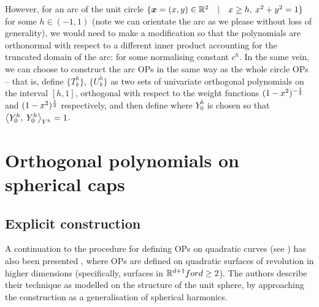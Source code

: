 However, for an arc of the unit circle $\{ \bm{x} = (x,y) \in \mathbb{R}^2 \quad | \quad x \ge h, \: x^2 + y^2 = 1 \}$ for some $h \in (-1, 1)$ (note we can orientate the arc as we please without loss of generality), we would need to make a modification so that the polynomials are orthonormal with respect to a different inner product accounting for the truncated domain of the arc:
for some normalising constant $c^h$. In the same vein, we can choose to construct the arc OPs in the same way as the whole circle OPs -- that is, define $\{T_k^h\}$, $\{U_k^h\}$ as two sets of univariate orthogonal polynomials on the interval $[h,1]$, orthogonal with respect to the weight functions $(1-x^2)^{-\frac{1}{2}}$ and $(1-x^2)^{\frac{1}{2}}$ respectively, and then define
where $Y_0^h$ is chosen so that $\ip< Y_0^h, \: Y_0^h >_{\ch^h} = 1$.



\section{Orthogonal polynomials on spherical caps}\label{section:sc:OPs}

\subsection{Explicit construction}

A continuation to the procedure for defining OPs on quadratic curves (see \cite{olver2021orthogonal}) has also been presented \cite{olver2020orthogonal}, where OPs are defined on quadratic surfaces of revolution in higher dimensions (specifically, surfaces in $\mathbb{R}^{d+1} for d \ge 2$). The authors describe their technique as modelled on the structure of the unit sphere, by approaching the construction as a generalisation of spherical harmonics.

